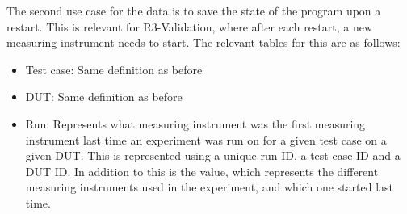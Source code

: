 The second use case for the data is to save the state of the program upon a restart. This is relevant for R3-Validation, where after each restart, a new measuring instrument needs to start. The relevant tables for this are as follows:

\begin{itemize}
    \item Test case: Same definition as before
    \item DUT: Same definition as before
    \item Run: Represents what measuring instrument was the first measuring instrument last time an experiment was run on for a given test case on a given DUT. This is represented using a unique run ID, a test case ID and a DUT ID. In addition to this is the value, which represents the different measuring instruments used in the experiment, and which one started last time.
\end{itemize}

